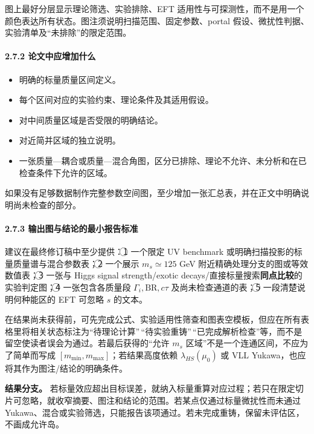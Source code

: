\documentclass[
  chinese,
  UTF8]{ctexart}
\providecommand{\tightlist}{%
  \setlength{\itemsep}{0pt}\setlength{\parskip}{0pt}}
\begin{document}
图上最好分层显示理论筛选、实验排除、EFT
适用性与可探测性，而不是用一个颜色表达所有状态。图注须说明扫描范围、固定参数、portal
假设、微扰性判据、实验清单及``未排除''的限定范围。

\paragraph{2.7.2
论文中应增加什么}\label{ux8bbaux6587ux4e2dux5e94ux589eux52a0ux4ec0ux4e48}

\begin{itemize}
\tightlist
\item
  明确的标量质量区间定义。
\item
  每个区间对应的实验约束、理论条件及其适用假设。
\item
  对中间质量区域是否受限的明确结论。
\item
  对近简并区域的独立说明。
\item
  一张质量---耦合或质量---混合角图，区分已排除、理论不允许、未分析和在已检查条件下允许的区域。
\end{itemize}

如果没有足够数据制作完整参数空间图，至少增加一张汇总表，并在正文中明确说明尚未检查的部分。

\paragraph{2.7.3
输出图与结论的最小报告标准}\label{ux8f93ux51faux56feux4e0eux7ed3ux8bbaux7684ux6700ux5c0fux62a5ux544aux6807ux51c6}

建议在最终修订稿中至少提供：\textcircled{1} 一个限定 UV benchmark
或明确扫描投影的标量质量谱与混合参数表；\textcircled{2} 一个展示
\(m_s\simeq125\) GeV 附近精确处理分支的图或等效数值表；\textcircled{3}
一张与 Higgs signal strength/exotic
decays/直接标量搜索\textbf{同点比较}的实验判定图；\textcircled{4}
一张包含各质量段 \(\Gamma_i,\mathrm{BR},c\tau\)
及尚未检查通道的表；\textcircled{5} 一段清楚说明何种能区的 EFT 可忽略
\(s\) 的文本。

在结果尚未获得前，可先完成公式、实验适用性筛查和图表空模板，但应在所有表格里将相关状态标注为``待理论计算''\,``待实验重铸''\,``已完成解析检查''等，而不是留空使读者误会为通过。若最后获得的``允许
\(m_s\) 区域''不是一个连通区间，不应为了简单而写成
\([m_{\min},m_{\max}]\)；若结果高度依赖 \(\lambda_{HS}(\mu_0)\) 或 VLL
Yukawa，也应将其作为图注/结论的明确条件。

\textbf{结果分支。}
若标量效应超出目标误差，就纳入标量重算对应过程；若只在限定切片可忽略，就收窄摘要、图注和结论的范围。若某点仅通过标量微扰性而未通过
Yukawa、混合或实验筛选，只能报告该项通过。若未完成重铸，保留未评估区，不画成允许岛。
\end{document}
